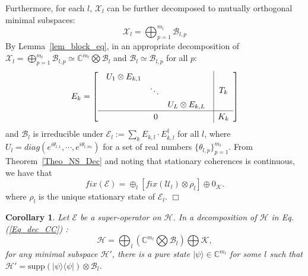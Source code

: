 \documentclass[journal]{IEEEtran}
\def\h{\ensuremath{\mathcal{H}}}
\def\u{\ensuremath{\mathcal{U}}}
\def\k{\ensuremath{\mathcal{K}}}
\def\u{\ensuremath{\mathcal{U}}}
\def\x{\ensuremath{\mathcal{X}}}
\def\b{\ensuremath{\mathcal{B}}}
\def\e{\ensuremath{\mathcal{E}}}
\def\k{\mathcal{K}}
\newtheorem{corollary}{Corollary}
\begin{document}
Furthermore, for each $l$, $\x_l$ can be further decomposed to mutually orthogonal minimal subspaces:
$$\x_l=\bigoplus_{p=1}^{m_l}\b_{l,p}$$
By Lemma~\ref{lem_block_eq}, %
in  an appropriate decomposition  of $\x_l=\bigoplus_{p=1}^{m_l}\b_{l,p}\simeq \mathbb{C}^{m_l}\bigotimes \b_l$ and $\b_l\simeq \b_{l,p}$ for all $p$:
\begin{eqnarray}
    \renewcommand{\arraystretch}{1.2}
E_k=\left[\begin{array}{c|c}
  \begin{array}{ccc}
  U_{1}\otimes E_{k,1} &  &\\
   & \ddots &\\
   & & U_{L}\otimes E_{k,L}  
  \end{array} & T_k\\
  \hline
0&K_k
\end{array}\right]
  \end{eqnarray}
and $\b_l$ is irreducible under $\e_{l}:=\sum_{k}E_{k,l}\cdot E_{k,l}^\dagger$  for all $l$, 
where $U_l=diag(e^{i\theta_{l,1}},\cdots,e^{i\theta_{l,m_l}})$ for a set of real numbers $\{\theta_{l,p}\}_{p=1}^{m_l}.$  From Theorem~\ref{Theo_NS_Dec} and noting that stationary coherences is continuous, we have that 
$$fix(\e)=\oplus_l[fix(\u_{l})\otimes \rho_l]\oplus 0_\k.$$ 
where $\rho_l$ is the unique stationary state of $\e_l.$ \hfill $\Box$
\begin{corollary}\label{Cor_mini}
  Let $\e$ be a super-operator  on $\h$. In a decomposition of $\h$ in Eq.(\ref{Eq_dec_CC}) :
$$\h=\bigoplus_l(\mathbb{C}^{m_l}\bigotimes \b_l)\bigoplus \k,$$ for any minimal subspace $\h'$, there is a pure state $|\psi\rangle\in \mathbb{C}^{m_l}$ for some $l$ such that $\h'=\textrm{supp}(|\psi\rangle\langle \psi|)\otimes \b_l$. 
\end{corollary}

\end{document}
